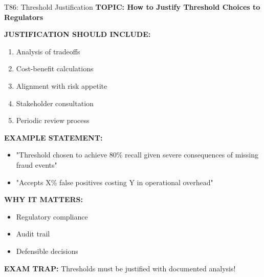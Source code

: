 \documentclass[8pt]{beamer}
\begin{document}
	\begin{frame}{T86: Threshold Justification}
		\fontsize{6.5}{7.5}\selectfont
		\textbf{TOPIC: How to Justify Threshold Choices to Regulators}
		
		\vspace{0.1cm}
		\textbf{JUSTIFICATION SHOULD INCLUDE:}
		\begin{enumerate}
			\item Analysis of tradeoffs
			\item Cost-benefit calculations
			\item Alignment with risk appetite
			\item Stakeholder consultation
			\item Periodic review process
		\end{enumerate}
		
		\vspace{0.1cm}
		\textbf{EXAMPLE STATEMENT:}
		\begin{itemize}
			\item "Threshold chosen to achieve 80\% recall given severe consequences of missing fraud events"
			\item "Accepts X\% false positives costing Y in operational overhead"
		\end{itemize}
		
		\vspace{0.1cm}
		\textbf{WHY IT MATTERS:}
		\begin{itemize}
			\item Regulatory compliance
			\item Audit trail
			\item Defensible decisions
		\end{itemize}
		
		\textcolor{myred}{\textbf{EXAM TRAP:}} Thresholds must be \textcolor{myblue}{justified with documented analysis}!
	\end{frame}
	
\end{document}
